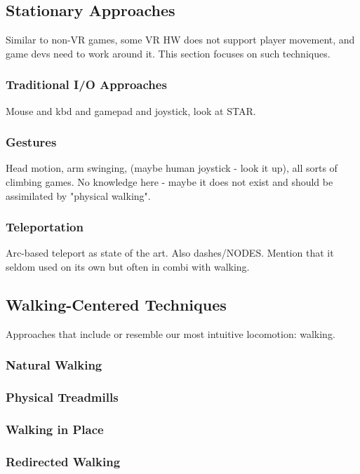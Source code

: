 \subsection{Stationary Approaches}

Similar to non-VR games, some VR HW does not support player movement, and game devs need to work around it. This section focuses on such techniques.



\subsubsection{Traditional I/O Approaches}
Mouse and kbd and gamepad and joystick, look at STAR.



\subsubsection{Gestures}
Head motion, arm swinging, (maybe human joystick - look it up), all sorts of climbing games. No knowledge here - maybe it does not exist and should be assimilated by "physical walking".



\subsubsection{Teleportation}
Arc-based teleport as state of the art. Also dashes/NODES. Mention that it seldom used on its own but often in combi with walking.




\subsection{Walking-Centered Techniques}
Approaches that include or resemble our most intuitive locomotion: walking.


\subsubsection{Natural Walking}
\subsubsection{Physical Treadmills}
\subsubsection{Walking in Place}
\subsubsection{Redirected Walking}


